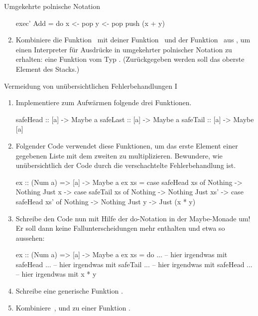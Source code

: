 \documentclass{uebblatt}
\begin{document}
\begin{aufgabe}{Umgekehrte polnische Notation}
\begin{enumerate}
\begin{haskellcode}
exec' Add = do
    x <- pop
    y <- pop
    push (x + y)
\end{haskellcode}
\item Kombiniere die Funktion~ mit deiner Funktion~ und der
Funktion~ aus , um
einen Interpreter für Ausdrücke in umgekehrter polnischer Notation zu erhalten:
eine Funktion vom Typ . (Zurückgegeben
werden soll das oberste Element des Stacks.)
\end{enumerate}
\end{aufgabe}

\begin{aufgabe}{Vermeidung von unübersichtlichen Fehlerbehandlungen I}
\begin{enumerate}
\item Implementiere zum Aufwärmen folgende drei Funktionen.

\begin{haskellcode}
safeHead :: [a] -> Maybe a
safeLast :: [a] -> Maybe a
safeTail :: [a] -> Maybe [a]
\end{haskellcode}

\item Folgender Code verwendet diese Funktionen, um das erste Element einer
gegebenen Liste mit dem zweiten zu multiplizieren. Bewundere, wie unübersichtlich
der Code durch die verschachtelte Fehlerbehandlung ist.

\begin{haskellcode}
ex :: (Num a) => [a] -> Maybe a
ex xs = case safeHead xs of
    Nothing -> Nothing
    Just x  -> case safeTail xs of
        Nothing  -> Nothing
        Just xs' -> case safeHead xs' of
            Nothing -> Nothing
            Just y  -> Just (x * y)
\end{haskellcode}

\item Schreibe den Code nun mit Hilfe der do-Notation in der Maybe-Monade um!
Er soll dann keine Fallunterscheidungen mehr enthalten und etwa so aussehen:

\begin{haskellcode}
ex :: (Num a) => [a] -> Maybe a
ex xs = do
    ...   -- hier irgendwas mit safeHead
    ...   -- hier irgendwas mit safeTail
    ...   -- hier irgendwas mit safeHead
    ...   -- hier irgendwas mit x * y
\end{haskellcode}

\item Schreibe eine generische Funktion .

\item Kombiniere~, 
und  zu einer Funktion .
\end{enumerate}
\end{aufgabe}
\end{document}
